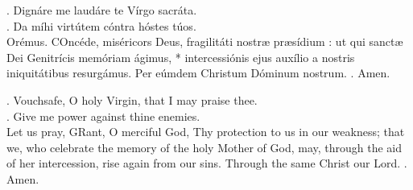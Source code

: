 \documentclass[11pt]{extarticle} %
\begin{document}
\setlength{\columnsep}{18pt}
\setlength{\columnseprule}{1pt}
\begin{multicols}{2}
\noindent\Vbar. Dignáre me laudáre te Vírgo sacráta.
\\
\Rbar. Da míhi virtútem cóntra hóstes túos.\\

\noindent\hspace*{3em}Orémus.
\lettrine{C}Oncéde, miséricors Deus, fragilitáti nostræ præsídium : \gredagger{} ut qui sanctæ Dei Genitrícis memóriam ágimus, * intercessiónis ejus auxílio a nostris iniquitátibus resurgámus. Per eúmdem Christum Dóminum nostrum. \Rbar. Amen. %
\columnbreak

\noindent\Vbar. Vouchsafe, O holy Virgin, that I may praise thee.\\
\Rbar. Give me power against thine enemies.\\

\noindent\hspace*{3em}Let us pray,
\noindent{}\lettrine{G}Rant, O merciful God, Thy protection to us in our weakness; that we, who celebrate the memory of the holy Mother of God, may, through the aid of her intercession, rise again from our sins. Through the same Christ our Lord. \Rbar. Amen. %
\end{multicols}
\end{document}
